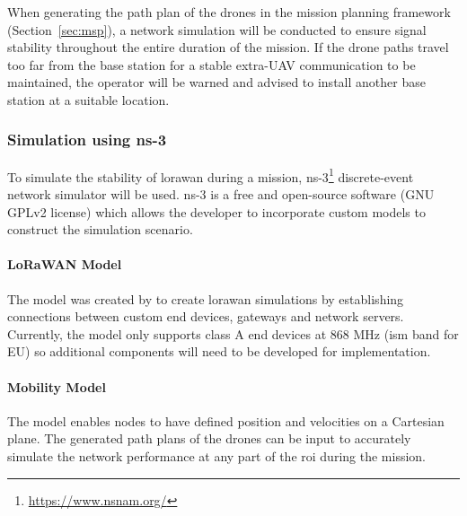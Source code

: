 When generating the path plan of the drones in the mission planning framework (Section~\ref{sec:msp}), a network simulation will be conducted to ensure signal stability throughout the entire duration of the mission. If the drone paths travel too far from the base station for a stable extra-\gls{UAV} communication to be maintained, the operator will be warned and advised to install another base station at a suitable location. 
 
\subsubsection{Simulation using ns-3}

To simulate the stability of \gls{lorawan} during a mission, ns-3\footnote{\url{https://www.nsnam.org/}} discrete-event network simulator will be used. ns-3 is a free and open-source software (GNU GPLv2 license) which allows the developer to incorporate custom models to construct the simulation scenario. 

\paragraph{LoRaWAN Model} The model was created by \cite{magrin2017lora} to create \gls{lorawan} simulations by establishing connections between custom end devices, gateways and network servers. Currently, the model only supports class A end devices at 868 MHz (\gls{ism} band for EU) so additional components will need to be developed for implementation. 

\paragraph{Mobility Model} The model enables nodes to have defined position and velocities on a Cartesian plane. The generated path plans of the drones can be input to accurately simulate the network performance at any part of the \gls{roi} during the mission. 
